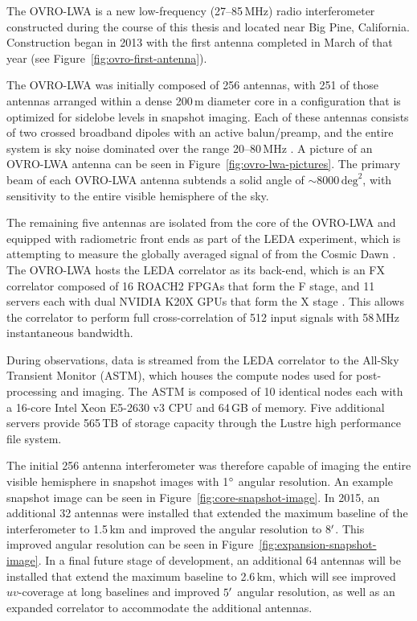 \begin{bibunit}
The OVRO-LWA is a new low-frequency (27--85\,MHz) radio interferometer constructed during the course
of this thesis and located near Big Pine, California. Construction began in 2013 with the first
antenna completed in March of that year (see Figure~\ref{fig:ovro-first-antenna}).

The OVRO-LWA was initially composed of 256 antennas, with 251 of those antennas arranged within a
dense 200\,m diameter core in a configuration that is optimized for sidelobe levels in snapshot
imaging.  Each of these antennas consists of two crossed broadband dipoles with an active
balun/preamp, and the entire system is sky noise dominated over the range 20--80\,MHz
\citep{2012PASP..124.1090H}.  A picture of an OVRO-LWA antenna can be seen in
Figure~\ref{fig:ovro-lwa-pictures}. The primary beam of each OVRO-LWA antenna subtends a solid angle
of $\sim 8000\,\text{deg}^2$, with sensitivity to the entire visible hemisphere of the sky.


The remaining five antennas are isolated from the core of the OVRO-LWA and equipped with radiometric
front ends as part of the LEDA experiment, which is attempting to measure the globally averaged
signal of  from the Cosmic Dawn \citep{2018MNRAS.478.4193P}.  The OVRO-LWA hosts the LEDA
correlator as its back-end, which is an FX correlator composed of 16 ROACH2 FPGAs that form the F
stage, and 11 servers each with dual NVIDIA K20X GPUs that form the X stage
\citep{2015JAI.....450003K}. This allows the correlator to perform full cross-correlation of 512
input signals with 58\,MHz instantaneous bandwidth.

During observations, data is streamed from the LEDA correlator to the All-Sky Transient Monitor
(ASTM), which houses the compute nodes used for post-processing and imaging.  The ASTM is composed
of 10 identical nodes each with a 16-core Intel Xeon E5-2630 v3 CPU and 64\,GB of memory. Five
additional servers provide 565\,TB of storage capacity through the Lustre high performance file
system.

The initial 256 antenna interferometer was therefore capable of imaging the entire visible
hemisphere in snapshot images with 1$\mbox{$^\circ$}$ angular resolution. An example snapshot image can be
seen in Figure~\ref{fig:core-snapshot-image}.  In 2015, an additional 32 antennas were installed
that extended the maximum baseline of the interferometer to 1.5\,km and improved the angular
resolution to 8$\mbox{$^\prime$}$. This improved angular resolution can be seen in
Figure~\ref{fig:expansion-snapshot-image}. In a final future stage of development, an additional 64
antennas will be installed that extend the maximum baseline to 2.6\,km, which will see improved
$uv$-coverage at long baselines and improved $5\mbox{$^\prime$}$ angular resolution, as well as an expanded
correlator to accommodate the additional antennas.


\end{bibunit}
